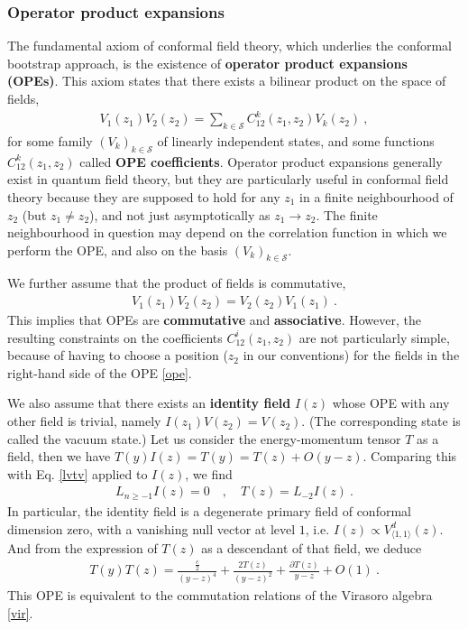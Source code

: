 \documentclass[12pt, a4paper]{article}
\newcommand{\myindex}[1]{\textbf{\boldmath #1}}
\begin{document}
\subsubsection{Operator product expansions}\label{sec:ope}

The fundamental axiom of conformal field theory, which underlies the conformal bootstrap approach, is the existence of \myindex{operator product expansions (OPEs)}. This axiom states that there exists a bilinear product on the space of fields, 
\begin{align}
  \boxed{V_1(z_1)V_2(z_2) = \sum_{k\in\mathcal{S}} C^k_{12}(z_1,z_2) V_k(z_2)}\ ,
  \label{ope}
 \end{align}
 for some family $(V_k)_{k\in\mathcal{S}}$ of linearly independent states, and 
some functions $C^k_{12}(z_1,z_2)$ called \myindex{OPE coefficients}. Operator product expansions generally exist in quantum field theory, but they are particularly useful in conformal field theory because they are supposed to hold for any $z_1$ in a finite neighbourhood of $z_2$ (but $z_1\neq z_2$), and not just asymptotically as $z_1\to z_2$. The finite neighbourhood in question may depend on the correlation function in which we perform the OPE, and also on the basis $(V_k)_{k\in\mathcal{S}}$. 

We further assume that the product of fields is commutative,
\begin{align}
 \boxed{V_1(z_1)V_2(z_2) = V_2(z_2)V_1(z_1)}\ .
 \label{comm}
\end{align}
This implies that OPEs are \myindex{commutative} and \myindex{associative}. However, the resulting constraints on the coefficients $C^i_{12}(z_1,z_2)$ are not particularly simple, because of having to choose a position ($z_2$ in our conventions) for the fields in the right-hand side of the OPE \eqref{ope}. 

We also assume that there exists an \myindex{identity field} $I(z)$ whose OPE with any other field is trivial, namely $I(z_1)V(z_2) = V(z_2)$. (The corresponding state is called the vacuum state.) Let us consider the energy-momentum tensor $T$ as a field, then we have 
$
 T(y)I(z) = T(y) = T(z)  + O(y-z)
$. 
Comparing this with Eq. \eqref{lvtv} applied to $I(z)$, we find 
\begin{align}
 L_{n\geq -1} I(z) = 0 \quad , \quad T(z) = L_{-2}I(z)\ .
\end{align}
In particular, the identity field is a degenerate primary field of conformal dimension zero, with a vanishing null vector at level $1$, i.e. $I(z) \propto V^d_{\langle 1,1\rangle}(z)$. And from the expression of $T(z)$ as a descendant of that field, we deduce
\begin{align}
 T(y)T(z) = \frac{\frac{c}{2}}{(y-z)^4} + \frac{2T(z)}{(y-z)^2} + \frac{\partial T(z)}{y-z} + O(1)\ .
\label{tt}
\end{align}
This OPE is equivalent to the commutation relations of the Virasoro algebra \eqref{vir}.
\end{document}
